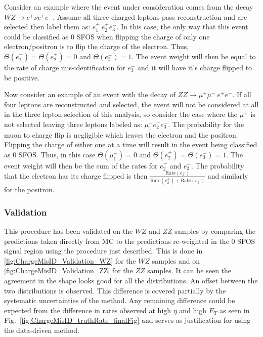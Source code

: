 Consider an example where the event under consideration comes from the 
decay $WZ\rightarrow e^{+}\nu e^{+}e^{-}$. Assume all three charged leptons 
pass reconstruction and are selected then label 
them as: $e^{+}_1~e^{+}_2e^{-}_3$. In this case,
the only way that this event could be classified as 0 SFOS when 
flipping the charge of only one electron/positron is to flip the 
charge of the electron.
Thus, $\Theta(e^{+}_1)=\Theta(e^{+}_2)=0$ and $\Theta(e^{-}_3)=1$.  The event 
weight will then be equal to the rate of charge mis-identification 
for  $e^{-}_3$ and it will have it's charge flipped to be positive.

Now consider an example of an event with 
the decay of $ZZ\rightarrow \mu^{+}\mu^{-}~ e^{+}e^{-}$.
If all four leptons are reconstructed and selected, the event will not 
be considered at all in the three lepton selection of this analysis, so 
consider the case where the $\mu^{+}$ is not selected leaving three leptons 
labeled as: $\mu^{-}_1 e^{+}_2 e^{-}_3$.  The probability for the muon to 
charge flip is negligible which leaves the electron and the positron. Flipping 
the charge of either one at a time will result in the event being 
classified as 0 SFOS.  Thus, in
this case $\Theta(\mu^{-}_1)=0$ and $\Theta(e^{+}_2)=\Theta(e^{-}_3)=1$. The 
event weight will then be the sum of the rates for $e^{+}_2$ and $e^{-}_3$.
The probability that the electron has its charge flipped is then 
$\frac{\textrm{Rate}(e^{-}_3) }{ \textrm{Rate}(e^{+}_2)+ \textrm{Rate}(e^{-}_3)}$ 
and similarly for the positron.

\subsubsection{Validation}
This procedure has been validated on the $WZ$ and $ZZ$ samples by comparing 
the predictions taken directly from MC to the predictions re-weighted in the 
0 SFOS signal region using the procedure just described. This is done in 
\fig\ref{fig:ChargeMisID_Validation_WZ} for the $WZ$ samples and on 
\fig\ref{fig:ChargeMisID_Validation_ZZ} for the $ZZ$ samples. It can be seen 
the agreement in the shape looks good for all the distributions. An offset 
between the two distributions is observed. This difference is covered partially by 
the systematic uncertainties of the method.  Any remaining difference could 
be expected from the difference in rates observed at high $\eta$ and 
high $E_{T}$ as seen in Fig.~\ref{fig:ChargeMisID_truthRate_finalFig} and 
serves as justification for using the data-driven method.

